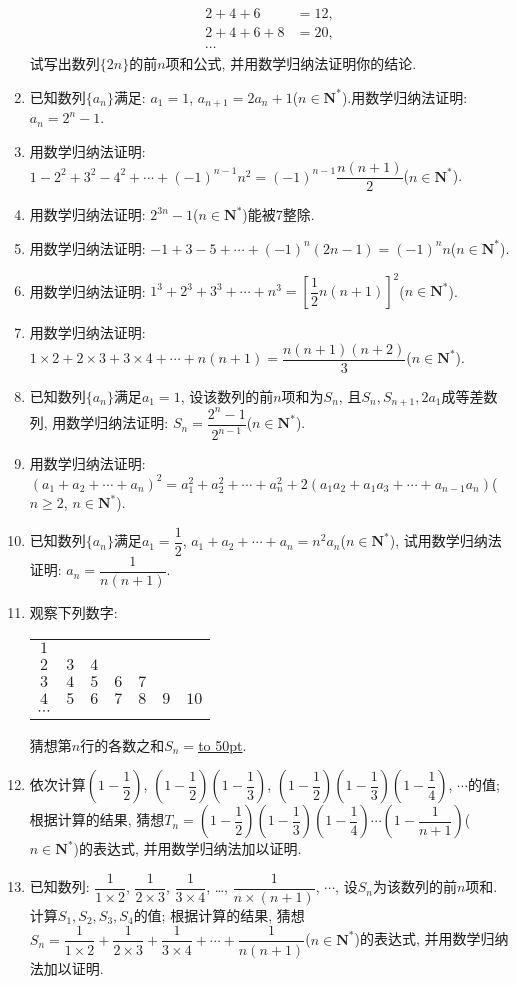 \documentclass[10pt,a4paper]{article}
\newcommand{\blank}[1]{\underline{\hbox to #1pt{}}}
\begin{document}
\begin{enumerate}[1.]
\begin{align*}
    2+4+6 & = 12,\\
    2+4+6+8 & = 20,\\
    \cdots &
\end{align*}
试写出数列$\{2n\}$的前$n$项和公式, 并用数学归纳法证明你的结论.
\item 已知数列$\{a_n\}$满足: $a_1=1$, $a_{n+1}=2a_n+1$($n\in \mathbf{N}^*$).用数学归纳法证明: $a_n=2^n-1$.
\item 用数学归纳法证明: $1-2^2+3^2-4^2+\cdots +(-1)^{n-1}n^2=(-1)^{n-1}\dfrac{n(n+1)}2$($n\in \mathbf{N}^*$).
\item 用数学归纳法证明: $2^{3n}-1$($n\in \mathbf{N}^*$)能被$7$整除.
\item 用数学归纳法证明: $-1+3-5+\cdots +(-1)^n(2n-1)=(-1)^nn$($n\in \mathbf{N}^*$).
\item 用数学归纳法证明: $1^3+2^3+3^3+\cdots +n^3=[\dfrac 12n(n+1)]^2$($n\in \mathbf{N}^*$).
\item 用数学归纳法证明: $1\times 2+2\times 3+3\times 4+\cdots +n(n+1)=\dfrac{n(n+1)(n+2)}3$($n\in \mathbf{N}^*$).
\item 已知数列$\{a_n\}$满足$a_1=1$, 设该数列的前$n$项和为$S_n$, 且$S_n,S_{n+1},2a_1$成等差数列, 用数学归纳法证明: $S_n=\dfrac{2^n-1}{2^{n-1}}$($n\in \mathbf{N}^*$).
\item 用数学归纳法证明:
$(a_1+a_2+\cdots +a_n)^2=a_1^2+a_2^2+\cdots +a_n^2+2(a_1a_2+a_1a_3+\cdots +a_{n-1}a_n)$($n\ge 2$, $n\in \mathbf{N}^*$).
\item 已知数列$\{a_n\}$满足$a_1=\dfrac 12$, $a_1+a_2+\cdots +a_n=n^2a_n$($n\in \mathbf{N}^*$), 试用数学归纳法证明: $a_n=\dfrac 1{n(n+1)}$.
\item 观察下列数字:
\begin{center}
    \begin{tabular}{ccccccc}
        $1$ \\
        $2$ & $3$ & $4$ \\
        $3$ & $4$ & $5$ & $6$ & $7$ \\
        $4$ & $5$ & $6$ & $7$ & $8$ & $9$ & $10$ \\
        $\cdots$ 
    \end{tabular}
\end{center}
猜想第$n$行的各数之和$S_n=$\blank{50}.
\item 依次计算$(1-\dfrac 12)$, $(1-\dfrac 12)(1-\dfrac 13)$, $(1-\dfrac 12)(1-\dfrac 13)(1-\dfrac 14)$, $\cdots$的值; 根据计算的结果, 猜想$T_n=(1-\dfrac 12)(1-\dfrac 13)(1-\dfrac 14)\cdots (1-\dfrac 1{n+1})$($n\in \mathbf{N}^*$)的表达式, 并用数学归纳法加以证明.
\item 已知数列: $\dfrac 1{1\times 2}$, $\dfrac 1{2\times 3}$, $\dfrac 1{3\times 4}$, …, $\dfrac 1{n\times (n+1)}$, $\cdots$, 设$S_n$为该数列的前$n$项和.计算$S_1,S_2,S_3,S_4$的值; 根据计算的结果, 猜想$S_n=\dfrac 1{1\times 2}+\dfrac 1{2\times 3}+\dfrac 1{3\times 4}+\cdots +\dfrac 1{n(n+1)}$($n\in \mathbf{N}^*$)的表达式, 并用数学归纳法加以证明.

\end{enumerate}
\end{document}
